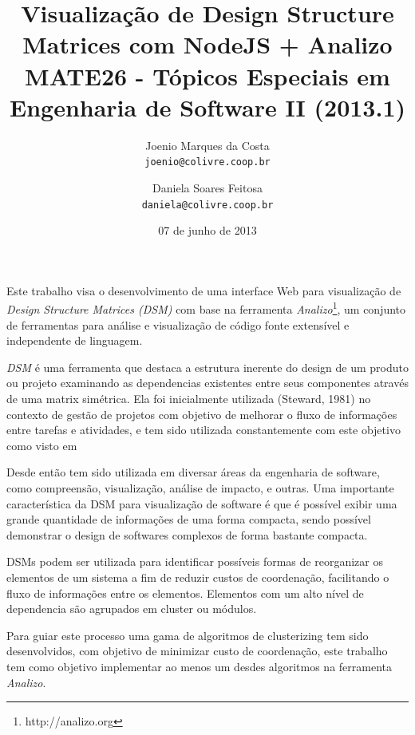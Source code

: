 \documentclass{article}
\title{Visualização de Design Structure Matrices com NodeJS + Analizo\\
 \large MATE26 - Tópicos Especiais em Engenharia de Software II (2013.1)}
\author{
  Joenio Marques da Costa\\
  \texttt{joenio@colivre.coop.br}
  \and
  Daniela Soares Feitosa\\
  \texttt{daniela@colivre.coop.br}
}
\date{07 de junho de 2013}
\begin{document}
\maketitle

Este trabalho visa o desenvolvimento de uma interface Web para visualização de
{\it Design Structure Matrices (DSM)} com base na ferramenta {\it
Analizo}\footnote{http://analizo.org}, um conjunto de ferramentas para análise
e visualização de código fonte extensível e independente de linguagem.

{\it DSM} é uma ferramenta que destaca a estrutura inerente do design de um
produto ou projeto examinando as dependencias existentes entre seus
componentes através de uma matrix simétrica\cite{ExploringStructure}. Ela foi
inicialmente utilizada (Steward, 1981) no contexto de gestão de projetos com
objetivo de melhorar o fluxo de informações entre tarefas e atividades, e tem
sido utilizada constantemente com este objetivo como visto em
\cite{AModelBasedMethod}

Desde então tem sido utilizada em diversar áreas
\cite{PredictingChange, PredictingRequirementChange, UsingTheDesignStructure}
da engenharia de software, como compreensão, visualização,
análise de impacto, e outras. Uma importante característica da DSM
para visualização de software é que é possível exibir uma grande quantidade de
informações de uma forma compacta, sendo possível demonstrar o design
de softwares complexos de forma bastante
compacta\cite{DependencyModel}.

DSMs podem ser utilizada para identificar possíveis formas de reorganizar os
elementos de um sistema a fim de reduzir custos de coordenação, facilitando o
fluxo de informações entre os elementos. Elementos com um alto nível de
dependencia são agrupados em cluster ou módulos.

Para guiar este processo uma gama de algoritmos de clusterizing tem sido
desenvolvidos, com objetivo de minimizar custo de coordenação, este trabalho
tem como objetivo implementar ao menos um desdes algoritmos na ferramenta {\it
Analizo}.
\end{document}
